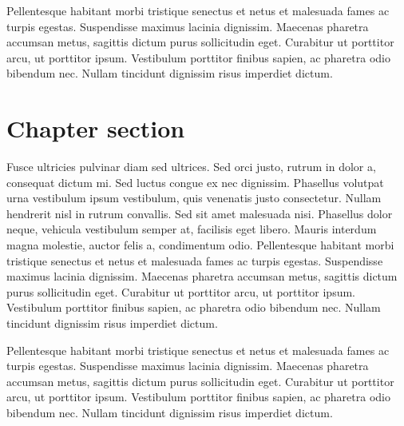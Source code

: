 Pellentesque habitant morbi tristique senectus et netus et malesuada fames ac turpis egestas. Suspendisse maximus lacinia dignissim. Maecenas pharetra accumsan metus, sagittis dictum purus sollicitudin eget. Curabitur ut porttitor arcu, ut porttitor ipsum. Vestibulum porttitor finibus sapien, ac pharetra odio bibendum nec. Nullam tincidunt dignissim risus imperdiet dictum.
\section{Chapter section}
Fusce ultricies pulvinar diam sed ultrices. Sed orci justo, rutrum in dolor a, consequat dictum mi. Sed luctus congue ex nec dignissim. Phasellus volutpat urna vestibulum ipsum vestibulum, quis venenatis justo consectetur. Nullam hendrerit nisl in rutrum convallis. Sed sit amet malesuada nisi. Phasellus dolor neque, vehicula vestibulum semper at, facilisis eget libero. Mauris interdum magna molestie, auctor felis a, condimentum odio. Pellentesque habitant morbi tristique senectus et netus et malesuada fames ac turpis egestas. Suspendisse maximus lacinia dignissim. Maecenas pharetra accumsan metus, sagittis dictum purus sollicitudin eget. Curabitur ut porttitor arcu, ut porttitor ipsum. Vestibulum porttitor finibus sapien, ac pharetra odio bibendum nec. Nullam tincidunt dignissim risus imperdiet dictum.

Pellentesque habitant morbi tristique senectus et netus et malesuada fames ac turpis egestas. Suspendisse maximus lacinia dignissim. Maecenas pharetra accumsan metus, sagittis dictum purus sollicitudin eget. Curabitur ut porttitor arcu, ut porttitor ipsum. Vestibulum porttitor finibus sapien, ac pharetra odio bibendum nec. Nullam tincidunt dignissim risus imperdiet dictum.

